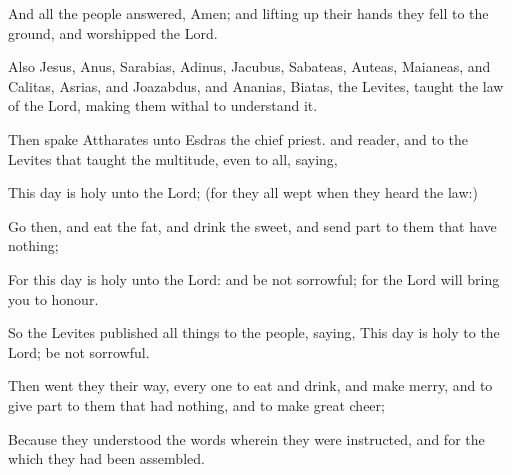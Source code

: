 {\par }{\PP {}And all the people answered, Amen; and lifting up their hands they fell to the ground, and worshipped the Lord.
\par }{\PP {}Also Jesus, Anus, Sarabias, Adinus, Jacubus, Sabateas, Auteas, Maianeas, and Calitas, Asrias, and Joazabdus, and Ananias, Biatas, the Levites, taught the law of the Lord, making them withal to understand it.
\par }{\PP {}Then spake Attharates unto Esdras the chief priest. and reader, and to the Levites that taught the multitude, even to all, saying,
\par }{\PP {}This day is holy unto the Lord; (for they all wept when they heard the law:)
\par }{\PP {}Go then, and eat the fat, and drink the sweet, and send part to them that have nothing;
\par }{\PP {}For this day is holy unto the Lord: and be not sorrowful; for the Lord will bring you to honour.
\par }{\PP {}So the Levites published all things to the people, saying, This day is holy to the Lord; be not sorrowful.
\par }{\PP {}Then went they their way, every one to eat and drink, and make merry, and to give part to them that had nothing, and to make great cheer;
\par }{\PP {}Because they understood the words wherein they were instructed, and for the which they had been assembled.
\par }